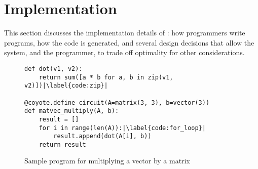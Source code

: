 \section{Implementation}\label{sec:implementation}

This section discusses the implementation details of \system: how programmers write \system programs, how the code is generated, and several design decisions that allow the system, and the programmer, to trade off optimality for other considerations.

  


\begin{figure}
    \small
    \begin{verbatim}
def dot(v1, v2):
    return sum([a * b for a, b in zip(v1, v2)])|\label{code:zip}|
  
@coyote.define_circuit(A=matrix(3, 3), b=vector(3))
def matvec_multiply(A, b):
    result = []
    for i in range(len(A)):|\label{code:for_loop}|
        result.append(dot(A[i], b))
    return result
    \end{verbatim}
    \vspace{-1em}
    \caption{Sample \system program for multiplying a vector by a matrix}\label{fig:coyote-program}
\end{figure}

            
